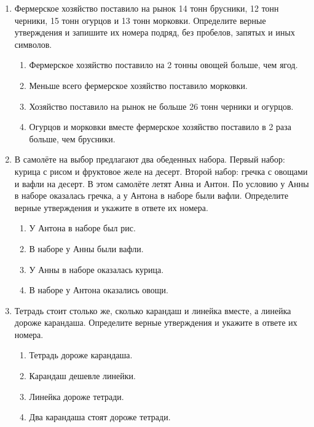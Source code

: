 \documentclass[a4paper,12pt]{article}
\newcommand{\taskspace}{\par\vspace{0.42cm}}
\begin{document}
\begin{enumerate}[resume]
\item Фермерское хозяйство поставило на рынок 14 тонн брусники, 12 тонн черники, 15 тонн огурцов и 13 тонн морковки. Определите верные утверждения и запишите их номера подряд, без пробелов, запятых и иных символов.
\begin{enumerate}[label=\arabic*),leftmargin=8mm,itemsep=0.25em,topsep=0.35em]
\item Фермерское хозяйство поставило на 2 тонны овощей больше, чем ягод.
\item Меньше всего фермерское хозяйство поставило морковки.
\item Хозяйство поставило на рынок не больше 26 тонн черники и огурцов.
\item Огурцов и морковки вместе фермерское хозяйство поставило в 2 раза больше, чем брусники.
\end{enumerate}

\taskspace

\item В самолёте на выбор предлагают два обеденных набора. Первый набор: курица с рисом и фруктовое желе на десерт. Второй набор: гречка с овощами и вафли на десерт. В этом самолёте летят Анна и Антон. По условию у Анны в наборе оказалась гречка, а у Антона в наборе были вафли. Определите верные утверждения и укажите в ответе их номера.
\begin{enumerate}[label=\arabic*),leftmargin=8mm,itemsep=0.25em,topsep=0.35em]
\item У Антона в наборе был рис.
\item В наборе у Анны были вафли.
\item У Анны в наборе оказалась курица.
\item В наборе у Антона оказались овощи.
\end{enumerate}

\taskspace

\item Тетрадь стоит столько же, сколько карандаш и линейка вместе, а линейка дороже карандаша. Определите верные утверждения и укажите в ответе их номера.
\begin{enumerate}[label=\arabic*),leftmargin=8mm,itemsep=0.25em,topsep=0.35em]
\item Тетрадь дороже карандаша.
\item Карандаш дешевле линейки.
\item Линейка дороже тетради.
\item Два карандаша стоят дороже тетради.
\end{enumerate}


\end{enumerate}
\end{document}
